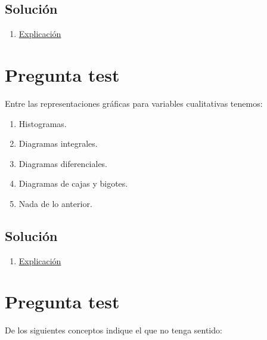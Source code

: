 \documentclass[
]{book}
\providecommand{\tightlist}{%
  \setlength{\itemsep}{0pt}\setlength{\parskip}{0pt}}
\begin{document}
\hypertarget{soluciuxf3n-23}{%
\subsection{Solución}\label{soluciuxf3n-23}}

\begin{enumerate}
\def\labelenumi{\alph{enumi})}
\setcounter{enumi}{3}
\tightlist
\item
  \href{https://1fjmanzano.github.io/bioestadistica/diagramas-de-barras-y-sectores.html}{Explicación}
\end{enumerate}

\hypertarget{pregunta-test-21}{%
\section{Pregunta test}\label{pregunta-test-21}}

Entre las representaciones gráficas para variables cualitativas tenemos:

\begin{enumerate}
\def\labelenumi{\alph{enumi})}
\tightlist
\item
  Histogramas.
\item
  Diagramas integrales.
\item
  Diagramas diferenciales.
\item
  Diagramas de cajas y bigotes.
\item
  Nada de lo anterior.
\end{enumerate}

\hypertarget{soluciuxf3n-24}{%
\subsection{Solución}\label{soluciuxf3n-24}}

\begin{enumerate}
\def\labelenumi{\alph{enumi})}
\setcounter{enumi}{3}
\tightlist
\item
  \href{https://1fjmanzano.github.io/bioestadistica/diagramas-de-barras-y-sectores.html}{Explicación}
\end{enumerate}

\hypertarget{pregunta-test-22}{%
\section{Pregunta test}\label{pregunta-test-22}}

De los siguientes conceptos indique el que no tenga sentido:
\end{document}
